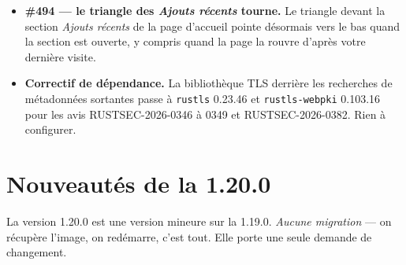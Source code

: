 \begin{itemize}
        Deux choses à savoir. Le service SRU est joint en \emph{HTTP
        simple sur le port 210} (\texttt{lx2.loc.gov}) : un réseau qui
        ne laisse sortir que les ports 80 et 443 affichera la Library
        of Congress comme injoignable dans l'onglet Health, et la
        chaîne passera simplement au fournisseur suivant. Et les titres
        en anglais scannés entre le 26 octobre et cette mise à jour
        n'ont reçu aucune donnée de la Library of Congress : ouvrez un
        tel titre et pressez \emph{Re-télécharger les métadonnées}, ou
        lancez \emph{Compléter les métadonnées via les bibliothèques}
        depuis l'onglet Health.
  \item \textbf{\#494 \string— le triangle des \emph{Ajouts récents}
        tourne.} Le triangle devant la section \emph{Ajouts récents} de
        la page d'accueil pointe désormais vers le bas quand la section
        est ouverte, y compris quand la page la rouvre d'après votre
        dernière visite.
  \item \textbf{Correctif de dépendance.} La bibliothèque TLS derrière
        les recherches de métadonnées sortantes passe à \texttt{rustls}
        0.23.46 et \texttt{rustls-webpki} 0.103.16 pour les avis
        RUSTSEC-2026-0346 à 0349 et RUSTSEC-2026-0382. Rien à
        configurer.
\end{itemize}

\section{Nouveautés de la 1.20.0}\label{sec:whats-new-1.20.0}

La version 1.20.0 est une version mineure sur la 1.19.0.
\emph{Aucune migration} --- on récupère l'image, on redémarre, c'est
tout. Elle porte une seule demande de changement.

